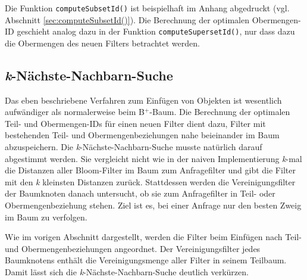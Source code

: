 Die Funktion \texttt{computeSubsetId()} ist beispielhaft im Anhang abgedruckt (vgl. Abschnitt \ref{sec:computeSubsetId()}). Die Berechnung der optimalen Obermengen-ID geschieht analog dazu in der Funktion \texttt{computeSupersetId()}, nur dass dazu die Obermengen des neuen Filters betrachtet werden. 
\subsection{\textit{k}-Nächste-Nachbarn-Suche}\label{sec:knn}
Das eben beschriebene Verfahren zum Einfügen von Objekten ist wesentlich aufwändiger als normalerweise beim B$^+$-Baum. Die Berechnung der optimalen Teil- und Obermengen-IDs für einen neuen Filter dient dazu, Filter mit bestehenden Teil- und Obermengenbeziehungen nahe beieinander im Baum abzuspeichern. Die \textit{k}-Nächste-Nachbarn-Suche musste natürlich darauf abgestimmt werden. Sie vergleicht nicht wie in der naiven Implementierung \textit{k}-mal die Distanzen aller Bloom-Filter im Baum zum Anfragefilter und gibt die Filter mit den \textit{k} kleinsten Distanzen zurück. Stattdessen werden die Vereinigungsfilter der Baumknoten danach untersucht, ob sie zum Anfragefilter in Teil- oder Obermengenbeziehung stehen. Ziel ist es, bei einer Anfrage nur den besten Zweig im Baum zu verfolgen.

Wie im vorigen Abschnitt dargestellt, werden die Filter beim Einfügen nach Teil- und Obermengenbeziehungen angeordnet. Der Vereinigungsfilter jedes Baumknotens enthält die Vereinigungsmenge aller Filter in seinem Teilbaum. Damit lässt sich die \textit{k}-Nächste-Nachbarn-Suche deutlich verkürzen. 

